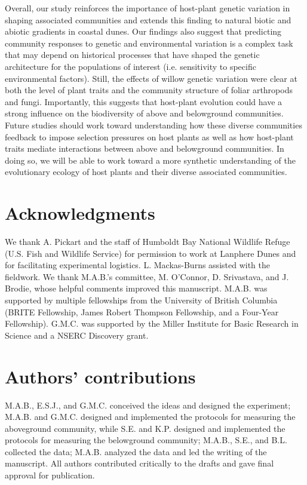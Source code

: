 \documentclass[11pt]{article}
\begin{document}
Overall, our study reinforces the importance of host-plant genetic
variation in shaping associated communities and extends this finding to
natural biotic and abiotic gradients in coastal dunes. Our
findings also suggest that predicting community responses to genetic and
environmental variation is a complex task that may depend on historical
processes that have shaped the genetic architecture for the populations
of interest (i.e. sensitivity to specific environmental factors). Still,
the effects of willow genetic variation were clear at both the level of
plant traits and the community structure of foliar arthropods and fungi.
Importantly, this suggests that host-plant evolution could have a strong
influence on the biodiversity of above and belowground communities.
Future studies should work toward understanding how these diverse
communities feedback to impose selection pressures on host plants as
well as how host-plant traits mediate interactions between above and
belowground communities. In doing so, we will be able to work toward a
more synthetic understanding of the evolutionary ecology of host plants
and their diverse associated communities.


\section*{Acknowledgments}

We thank A. Pickart and the staff of Humboldt Bay National Wildlife
Refuge (U.S. Fish and Wildlife Service) for permission to work at
Lanphere Dunes and for facilitating experimental logistics. L.
Mackas-Burns assisted with the fieldwork. We thank M.A.B.'s committee, M. O'Connor, D. Srivastava, and J. Brodie, whose helpful comments improved this manuscript. M.A.B. was supported by
multiple fellowships from the University of British Columbia (BRITE
Fellowship, James Robert Thompson Fellowship, and a Four-Year
Fellowship). G.M.C. was supported by the Miller Institute for Basic
Research in Science and a NSERC Discovery grant.

\section*{Authors' contributions}
M.A.B., E.S.J., and G.M.C. conceived the ideas and designed the experiment; M.A.B. and G.M.C. designed and implemented the protocols for measuring the aboveground community, while S.E. and K.P. designed and implemented the protocols for measuring the belowground community; M.A.B., S.E., and B.L. collected the data; M.A.B. analyzed the data and led the writing of the manuscript. All authors contributed critically to the drafts and gave final approval for publication.
\end{document}
